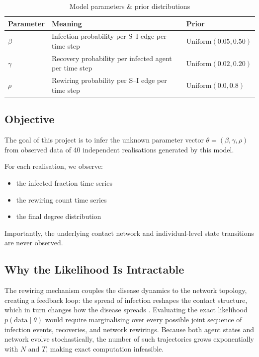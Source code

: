 \documentclass[12pt, a4paper]{article}
\begin{document}
\begin{table}[h]
\centering
\begin{tabular}{lll}
\hline
\textbf{Parameter} & \textbf{Meaning}  & \textbf{Prior} \\ \hline
$\beta$   & Infection probability per S–I edge per time step      & $\text{Uniform}(0.05, 0.50)$ \\ \hline
$\gamma$  & Recovery probability per infected agent per time step & $\text{Uniform}(0.02, 0.20)$ \\ \hline
$\rho$    & Rewiring probability per S–I edge per time step       & $\text{Uniform}(0.0, 0.8)$   \\ \hline
\end{tabular}
\caption{Model parameters \& prior distributions}
\end{table}

\subsection{Objective}
The goal of this project is to infer the unknown parameter vector $\theta = (\beta, \gamma, \rho)$ from observed data of 40 independent realisations generated by this model. 

For each realisation, we observe:
\begin{itemize}
    \item the infected fraction time series
    \item the rewiring count time series
    \item the final degree distribution
\end{itemize}
Importantly, the underlying contact network and individual-level state transitions are never observed.

\subsection{Why the Likelihood Is Intractable}
The rewiring mechanism couples the disease dynamics to the network topology, creating a feedback loop: the spread of infection reshapes the contact structure, which in turn changes how the disease spreads \citep{gross2006epidemic}. Evaluating the exact likelihood $p(\text{data} \mid \theta)$ would require marginalising over every possible joint sequence of infection events, recoveries, and network rewirings. Because both agent states and network evolve stochastically, the number of such trajectories grows exponentially with $N$ and $T$, making exact computation infeasible. 
\end{document}
